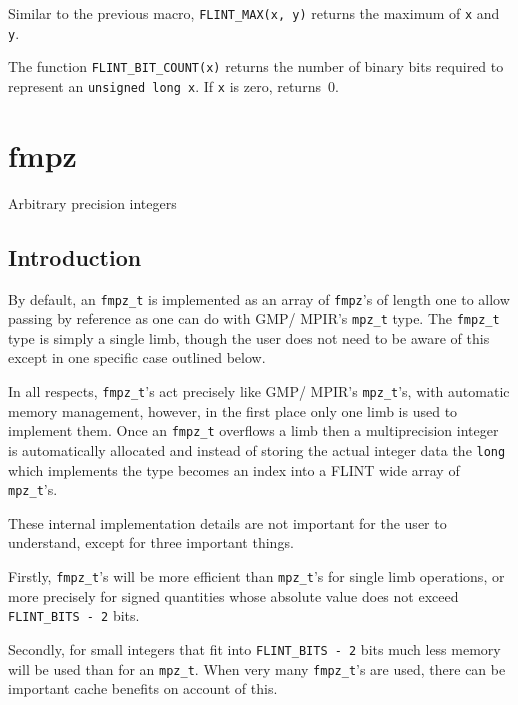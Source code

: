 \documentclass[a4paper,10pt]{book}
\newcommand{\code}{\lstinline}
\begin{document}
Similar to the previous macro, \code{FLINT_MAX(x, y)} returns the 
maximum of \code{x} and \code{y}.

The function \code{FLINT_BIT_COUNT(x)} returns the number of binary bits 
required to represent an \code{unsigned long x}.  If \code{x} is zero, 
returns~$0$.


\chapter{fmpz}
\epigraph{Arbitrary precision integers}{}

\section{Introduction}

By default, an \code{fmpz_t} is implemented as an array of \code{fmpz}'s of 
length one to allow passing by reference as one can do with GMP/ MPIR's 
\code{mpz_t} type.  The \code{fmpz_t} type is simply a single limb, though 
the user does not need to be aware of this except in one specific case 
outlined below.

In all respects, \code{fmpz_t}'s act precisely like GMP/ MPIR's 
\code{mpz_t}'s, with automatic memory management, however, in the first 
place only one limb is used to implement them.  Once an \code{fmpz_t} 
overflows a limb then a multiprecision integer is automatically allocated 
and instead of storing the actual integer data the \code{long} which 
implements the type becomes an index into a FLINT wide array of 
\code{mpz_t}'s.

These internal implementation details are not important for the user to 
understand, except for three important things.

Firstly, \code{fmpz_t}'s will be more efficient than \code{mpz_t}'s for 
single limb operations, or more precisely for signed quantities whose 
absolute value does not exceed \code{FLINT_BITS - 2} bits.

Secondly, for small integers that fit into \code{FLINT_BITS - 2} bits 
much less memory will be used than for an \code{mpz_t}.  When very many 
\code{fmpz_t}'s are used, there can be important cache benefits on 
account of this.
\end{document}
